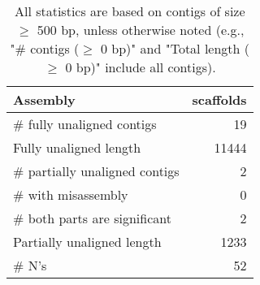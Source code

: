\documentclass[12pt,a4paper]{article}
\begin{document}
\begin{table}[ht]
\begin{center}
\caption{All statistics are based on contigs of size $\geq$ 500 bp, unless otherwise noted (e.g., "\# contigs ($\geq$ 0 bp)" and "Total length ($\geq$ 0 bp)" include all contigs).}
\begin{tabular}{|l*{1}{|r}|}
\hline
Assembly & scaffolds \\ \hline
\# fully unaligned contigs & 19 \\ \hline
Fully unaligned length & 11444 \\ \hline
\# partially unaligned contigs & 2 \\ \hline
\hspace{5mm}\# with misassembly & 0 \\ \hline
\hspace{5mm}\# both parts are significant & 2 \\ \hline
Partially unaligned length & 1233 \\ \hline
\# N's & 52 \\ \hline
\end{tabular}
\end{center}
\end{table}
\end{document}

